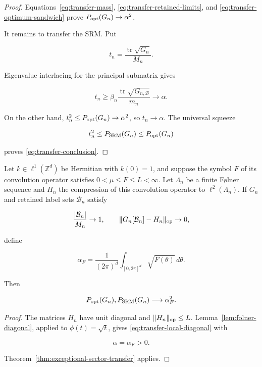 \begin{proof}
Equations~\eqref{eq:transfer-mass},
\eqref{eq:transfer-retained-limits}, and
\eqref{eq:transfer-optimum-sandwich} prove
\(P_{\rm opt}(G_n)\to\alpha^2\).

It remains to transfer the SRM. Put

\[
t_n=\frac{\operatorname{tr}\sqrt{G_n}}{M_n}.
\]

Eigenvalue interlacing for the principal submatrix gives

\[
t_n\ge
\beta_n\frac{\operatorname{tr}\sqrt{G_{n,\mathcal B}}}{m_n}
\longrightarrow\alpha.
\]

On the other hand, \(t_n^2\le P_{\rm opt}(G_n)\to\alpha^2\), so
\(t_n\to\alpha\). The universal squeeze

\[
t_n^2\le P_{\rm SRM}(G_n)\le P_{\rm opt}(G_n)
\]

proves \eqref{eq:transfer-conclusion}.
\end{proof}

\begin{corollary}
\label{cor:folner-comparison-transfer}
Let \(k\in\ell^1(\mathbb Z^d)\) be Hermitian with \(k(0)=1\), and suppose
the symbol \(F\) of its convolution operator satisfies
\(0<\mu\le F\le L<\infty\). Let \(\Lambda_n\) be a finite Følner sequence
and \(H_n\) the compression of this convolution operator to
\(\ell^2(\Lambda_n)\). If \(G_n\) and retained label sets
\(\mathcal B_n\) satisfy

\[
\frac{|\mathcal B_n|}{M_n}\to1,
\qquad
\|G_n[\mathcal B_n]-H_n\|_{\rm op}\to0,
\]

define

\begin{equation}
\label{eq:folner-transfer-alpha}
\alpha_F=\frac1{(2\pi)^d}
\int_{[0,2\pi]^d}\sqrt{F(\theta)}\,d\theta.
\end{equation}

Then

\begin{equation}
\label{eq:folner-transfer-conclusion}
P_{\rm opt}(G_n),P_{\rm SRM}(G_n)
\longrightarrow\alpha_F^2.
\end{equation}
\end{corollary}

\begin{proof}
The matrices \(H_n\) have unit diagonal and
\(\|H_n\|_{\rm op}\le L\). Lemma~\ref{lem:folner-diagonal}, applied to
\(\phi(t)=\sqrt t\), gives
\eqref{eq:transfer-local-diagonal} with

\[
\alpha=\alpha_F>0.
\]

Theorem~\ref{thm:exceptional-sector-transfer} applies.
\end{proof}

